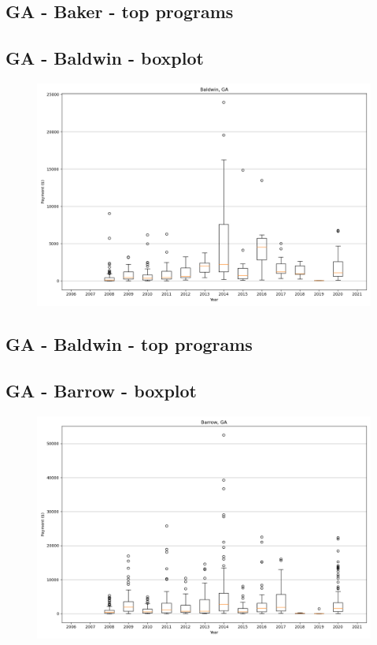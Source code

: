 \subsection*{GA - Baker - top programs}

\newpage
\subsection*{GA - Baldwin - boxplot}
\begin{figure}[h]
\centering
\includegraphics[width=7in]{../output/boxplots/counties/Baldwin-GA_boxplot.png}
\end{figure}


\subsection*{GA - Baldwin - top programs}

\newpage
\subsection*{GA - Barrow - boxplot}
\begin{figure}[h]
\centering
\includegraphics[width=7in]{../output/boxplots/counties/Barrow-GA_boxplot.png}
\end{figure}


